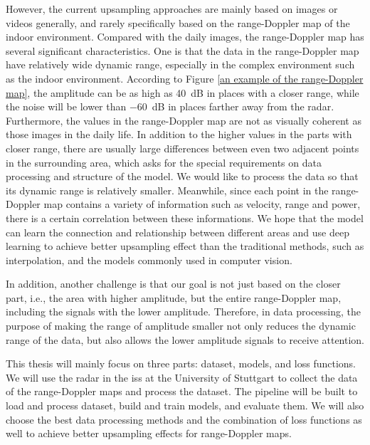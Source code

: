However, the current upsampling approaches are mainly based on images or videos generally, and rarely specifically based on the range-Doppler map of the indoor environment. Compared with the daily images, the range-Doppler map has several significant characteristics. One is that the data in the range-Doppler map have relatively wide dynamic range, especially in the complex environment such as the indoor environment. According to Figure \ref{an example of the range-Doppler map}, the amplitude can be as high as \SI{40}{dB} in places with a closer range, while the noise will be lower than \SI{-60}{dB} in places farther away from the radar. Furthermore, the values in the range-Doppler map are not as visually coherent as those images in the daily life. In addition to the higher values in the parts with closer range, there are usually large differences between even two adjacent points in the surrounding area, which asks for the special requirements on data processing and structure of the model. We would like to process the data so that its dynamic range is relatively smaller. Meanwhile, since each point in the range-Doppler map contains a variety of information such as velocity, range and power, there is a certain correlation between these informations. We hope that the model can learn the connection and relationship between different areas and use deep learning to achieve better upsampling effect than the traditional methods, such as interpolation, and the models commonly used in computer vision.

In addition, another challenge is that our goal is not just based on the closer part, i.e., the area with higher amplitude, but the entire range-Doppler map, including the signals with the lower amplitude. Therefore, in data processing, the purpose of making the range of amplitude smaller not only reduces the dynamic range of the data, but also allows the lower amplitude signals to receive attention.

This thesis will mainly focus on three parts: dataset, models, and loss functions. We will use the radar in the \gls{iss} at the University of Stuttgart to collect the data of the range-Doppler maps and process the dataset. The pipeline will be built to load and process dataset, build and train models, and evaluate them. We will also choose the best data processing methods and the combination of loss functions as well to achieve better upsampling effects for range-Doppler maps.

